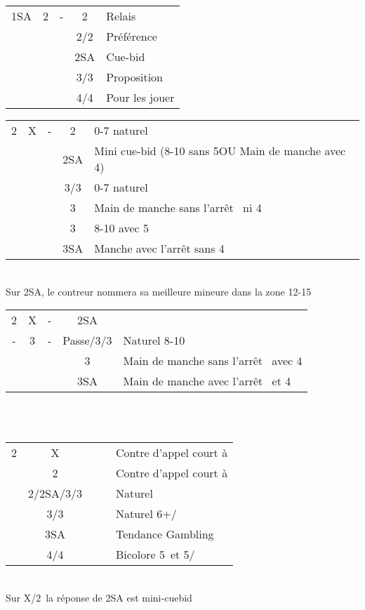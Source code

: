 \documentclass[a4paper, oneside, 11pt]{report}
\begin{document}
	\begin{tabular}{cccc|l}
	1SA & 2\trefle & - & 2\carreau & Relais\\
	&&& 2\coeur/2\pique & Préférence\\
	&&& 2SA & Cue-bid\\
	&&& 3\coeur/3\pique & Proposition\\
	&&& 4\coeur/4\pique & Pour les jouer\\
	\end{tabular}

	\begin{tabular}{cccc|l}
	2\coeur & X & - & 2\pique & 0-7 naturel\\
	&&& 2SA & Mini cue-bid (8-10 sans 5\pique OU Main de manche avec 4\pique)\\
	&&& 3\trefle/3\carreau & 0-7 naturel\\
	&&& 3\coeur & Main de manche sans l'arrêt \coeur\ ni 4\pique\\
	&&& 3\pique & 8-10 avec 5\pique\\
	&&& 3SA & Manche avec l'arrêt \coeur sans 4\pique\\
	\end{tabular}\\
	Sur 2SA,  le contreur nommera sa meilleure mineure dans la zone 12-15\\

	\begin{tabular}{cccc|l}
	2\coeur & X & - & 2SA &\\
	- & 3\trefle & - & Passe/3\carreau/3\pique & Naturel 8-10\\
	 &&& 3\coeur & Main de manche sans l'arrêt \coeur\ avec 4\pique\\
	 &&& 3SA & Main de manche avec l'arrêt \coeur\ et 4\pique\\
	\end{tabular}\\\\

	\begin{tabular}{cccc|l}
	2\carreau & X &&& Contre d'appel court à \pique\\
	& 2\coeur &&& Contre d'appel court à \coeur\\
	& 2\pique/2SA/3\trefle/3\carreau &&& Naturel\\
	& 3\coeur/3\pique &&& Naturel 6+\coeur/\pique\\
	& 3SA &&& Tendance Gambling\\
	& 4\trefle/4\carreau &&& Bicolore 5\pique\ et 5\trefle/\carreau\\
	\end{tabular}\\
	Sur X/2\coeur\ la réponse de 2SA est mini-cuebid\\
	
\end{document}
